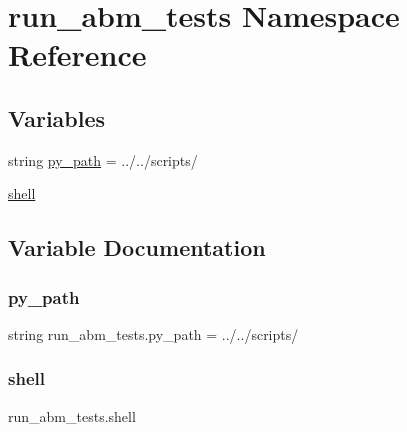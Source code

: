 \hypertarget{namespacerun__abm__tests}{}\section{run\+\_\+abm\+\_\+tests Namespace Reference}
\label{namespacerun__abm__tests}
\subsection*{Variables}
\begin{DoxyCompactItemize}
\item 
string \hyperlink{namespacerun__abm__tests_a13f76e1e1e0ae90f1e912f0da046638e}{py\+\_\+path} = \textquotesingle{}../../scripts/\textquotesingle{}
\item 
\hyperlink{namespacerun__abm__tests_a90ff649f60a241a4bcdbf38ec854ca4e}{shell}
\end{DoxyCompactItemize}


\subsection{Variable Documentation}
\mbox{\label{namespacerun__abm__tests_a13f76e1e1e0ae90f1e912f0da046638e}} 
\subsubsection{\texorpdfstring{py\+\_\+path}{py\_path}}
{\footnotesize\ttfamily string run\+\_\+abm\+\_\+tests.\+py\+\_\+path = \textquotesingle{}../../scripts/\textquotesingle{}}

\mbox{\label{namespacerun__abm__tests_a90ff649f60a241a4bcdbf38ec854ca4e}} 
\subsubsection{\texorpdfstring{shell}{shell}}
{\footnotesize\ttfamily run\+\_\+abm\+\_\+tests.\+shell}


